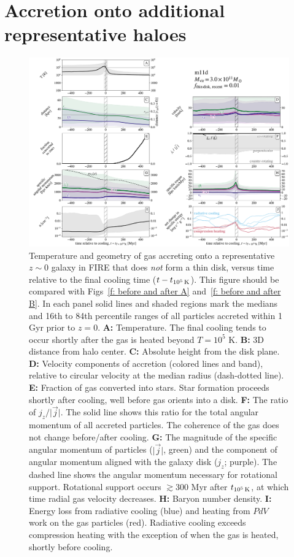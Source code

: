 \documentclass[fleqn,usenatbib]{mnras}
\newcommand{\tcools}{t_{10^5\,{\rm K}}}
\begin{document}
\section{Accretion onto additional representative haloes}
\label{s: appendix-more before and after}

\begin{figure}
\includegraphics[width=\textwidth]{figures/before_and_after/before_and_after_allone_m11d_md.pdf}
\caption{
Temperature and geometry of gas accreting onto a representative $z\sim0$ galaxy in FIRE that does \textit{not} form a thin disk, versus time relative to the final cooling time ($t - \tcools$).
This figure should be compared with Figs~\ref{f: before and after A} and~\ref{f: before and after B}.
In each panel solid lines and shaded regions mark the medians and 16th to 84th percentile ranges of all particles accreted within 1 Gyr prior to $z=0$.
\textbf{A:} Temperature.
The final cooling tends to occur shortly after the gas is heated beyond $T=10^5$ K.
\textbf{B:} 3D distance from halo center.
\textbf{C:} Absolute height from the disk plane.
\textbf{D:} Velocity components of accretion (colored lines and band), relative to circular velocity at the median radius (dash-dotted line).
\textbf{E:} Fraction of gas converted into stars.
Star formation proceeds shortly after cooling, well before gas orients into a disk.
\textbf{F:} The ratio of $j_z / \vert \vec j \vert$.
The solid line shows this ratio for the total angular momentum of all accreted particles.
The coherence of the gas does not change before/after cooling.
\textbf{G:} The magnitude of the specific angular momentum of particles ($\vert\vec{j}\vert$, green) and the component of angular momentum aligned with the galaxy disk ($j_z$; purple).
The dashed line shows the angular momentum necessary for rotational support.
Rotational support occurs $\gtrsim 300$ Myr after $\tcools$, at which time radial gas velocity decreases.
\textbf{H:} Baryon number density.
\textbf{I:} Energy loss from radiative cooling (blue) and heating from $PdV$ work on the gas particles (red).
Radiative cooling exceeds compression heating with the exception of when the gas is heated, shortly before cooling.
}
\label{f: counterexample}
\end{figure}
\end{document}
